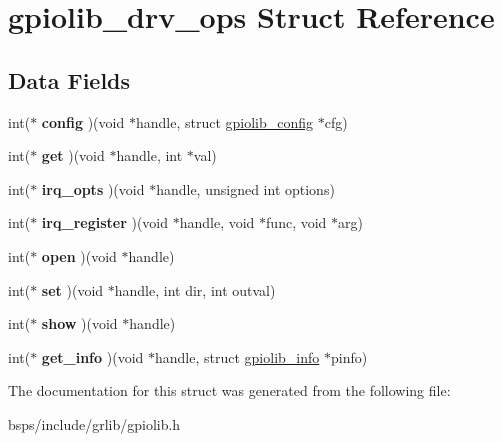 \hypertarget{structgpiolib__drv__ops}{}\section{gpiolib\+\_\+drv\+\_\+ops Struct Reference}
\label{structgpiolib__drv__ops}
\subsection*{Data Fields}
\begin{DoxyCompactItemize}
\item 
\mbox{\label{structgpiolib__drv__ops_a4302665ba5a94f355194c463ee30f552}} 
int($\ast$ {\bfseries config} )(void $\ast$handle, struct \mbox{\hyperlink{structgpiolib__config}{gpiolib\+\_\+config}} $\ast$cfg)
\item 
\mbox{\label{structgpiolib__drv__ops_a552f3d700b0c2e06bcd77aa6cb860294}} 
int($\ast$ {\bfseries get} )(void $\ast$handle, int $\ast$val)
\item 
\mbox{\label{structgpiolib__drv__ops_aacf571a10fc3532d9a608b7ec2fba93d}} 
int($\ast$ {\bfseries irq\+\_\+opts} )(void $\ast$handle, unsigned int options)
\item 
\mbox{\label{structgpiolib__drv__ops_aad2a2503801e1d3119edf7e944104872}} 
int($\ast$ {\bfseries irq\+\_\+register} )(void $\ast$handle, void $\ast$func, void $\ast$arg)
\item 
\mbox{\label{structgpiolib__drv__ops_ad082bcaa2bc8f4c4dc9041c04db0c553}} 
int($\ast$ {\bfseries open} )(void $\ast$handle)
\item 
\mbox{\label{structgpiolib__drv__ops_ae3ed41de27aed18e77c9cdfb8378add7}} 
int($\ast$ {\bfseries set} )(void $\ast$handle, int dir, int outval)
\item 
\mbox{\label{structgpiolib__drv__ops_abc19eec30532f93f7636bcd48840c499}} 
int($\ast$ {\bfseries show} )(void $\ast$handle)
\item 
\mbox{\label{structgpiolib__drv__ops_acbbcdcdd47591a272cd40d41e71a1f4e}} 
int($\ast$ {\bfseries get\+\_\+info} )(void $\ast$handle, struct \mbox{\hyperlink{structgpiolib__info}{gpiolib\+\_\+info}} $\ast$pinfo)
\end{DoxyCompactItemize}


The documentation for this struct was generated from the following file\+:\begin{DoxyCompactItemize}
\item 
bsps/include/grlib/gpiolib.\+h\end{DoxyCompactItemize}
